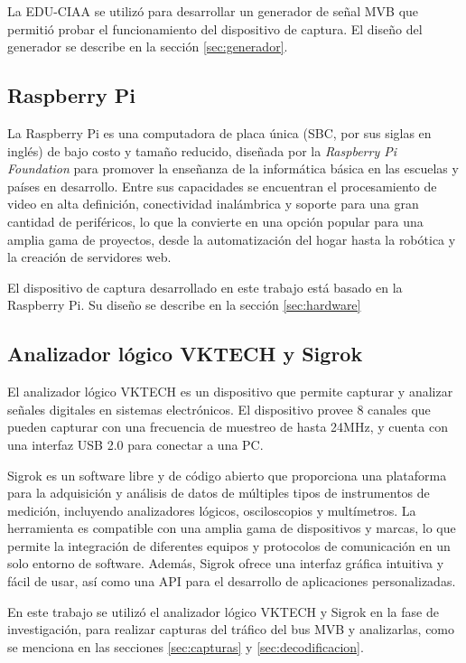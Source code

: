 La EDU-CIAA se utilizó para desarrollar un generador de señal MVB que permitió probar el funcionamiento del dispositivo de captura. El diseño del generador se describe en la sección \ref{sec:generador}.

\subsection{Raspberry Pi}

La Raspberry Pi \cite{web:rpi} es una computadora de placa única (SBC, por sus siglas en inglés) de bajo costo y tamaño reducido, diseñada por la \textit{Raspberry Pi Foundation} para promover la enseñanza de la informática básica en las escuelas y países en desarrollo.
Entre sus capacidades se encuentran el procesamiento de video en alta definición, conectividad inalámbrica y soporte para una gran cantidad de periféricos, lo que la convierte en una opción popular para una amplia gama de proyectos, desde la automatización del hogar hasta la robótica y la creación de servidores web.

El dispositivo de captura desarrollado en este trabajo está basado en la Raspberry Pi. Su diseño se describe en la sección \ref{sec:hardware}

\subsection{Analizador lógico VKTECH y Sigrok}

El analizador lógico VKTECH \cite{vktech} es un dispositivo que permite capturar y analizar señales digitales en sistemas electrónicos. El dispositivo provee 8 canales que pueden capturar con una frecuencia de muestreo de hasta 24MHz, y cuenta con una interfaz USB 2.0 para conectar a una PC.

Sigrok \cite{sigrok} es un software libre y de código abierto que proporciona una plataforma para la adquisición y análisis de datos de múltiples tipos de instrumentos de medición, incluyendo analizadores lógicos, osciloscopios y multímetros. La herramienta es compatible con una amplia gama de dispositivos y marcas, lo que permite la integración de diferentes equipos y protocolos de comunicación en un solo entorno de software. Además, Sigrok ofrece una interfaz gráfica intuitiva y fácil de usar, así como una API para el desarrollo de aplicaciones personalizadas.

En este trabajo se utilizó el analizador lógico VKTECH y Sigrok en la fase de investigación, para realizar capturas del tráfico del bus MVB y analizarlas, como se menciona en las secciones \ref{sec:capturas} y \ref{sec:decodificacion}.

